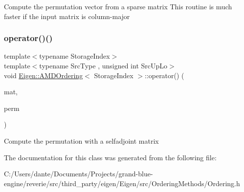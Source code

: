 Compute the permutation vector from a sparse matrix This routine is much faster if the input matrix is column-\/major \mbox{\label{class_eigen_1_1_a_m_d_ordering_a7f3fd7224b084f0f5655c97ea8eb6466}} 
\subsubsection{\texorpdfstring{operator()()}{operator()()}\hspace{0.1cm}{\footnotesize\ttfamily [2/2]}}
{\footnotesize\ttfamily template$<$typename Storage\+Index$>$ \\
template$<$typename Src\+Type , unsigned int Src\+Up\+Lo$>$ \\
void \mbox{\hyperlink{class_eigen_1_1_a_m_d_ordering}{Eigen\+::\+A\+M\+D\+Ordering}}$<$ Storage\+Index $>$\+::operator() (\begin{DoxyParamCaption}\item[{const \mbox{\hyperlink{class_eigen_1_1_sparse_self_adjoint_view}{Sparse\+Self\+Adjoint\+View}}$<$ Src\+Type, Src\+Up\+Lo $>$ \&}]{mat,  }\item[{\mbox{\hyperlink{class_eigen_1_1_permutation_matrix}{Permutation\+Type}} \&}]{perm }\end{DoxyParamCaption})\hspace{0.3cm}{\ttfamily [inline]}}

Compute the permutation with a selfadjoint matrix 

The documentation for this class was generated from the following file\+:\begin{DoxyCompactItemize}
\item 
C\+:/\+Users/dante/\+Documents/\+Projects/grand-\/blue-\/engine/reverie/src/third\+\_\+party/eigen/\+Eigen/src/\+Ordering\+Methods/Ordering.\+h\end{DoxyCompactItemize}
